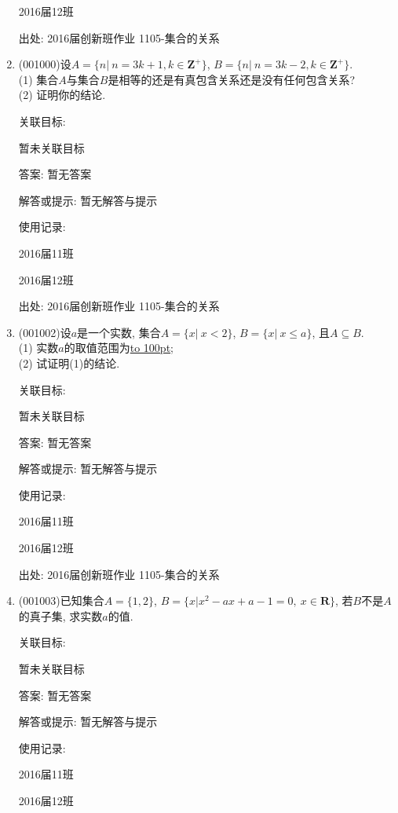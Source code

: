 \documentclass[10pt,a4paper]{article}
\newcommand{\blank}[1]{\underline{\hbox to #1pt{}}}
\begin{document}
\begin{enumerate}[1.]
2016届12班	


出处: 2016届创新班作业	1105-集合的关系
\item { (001000)}设$A=\{n|\ n=3k+1,k \in \mathbf{Z}^+\}$, $B=\{n|\ n=3k-2,k \in \mathbf{Z}^+\}$.\\ 
(1) 集合$A$与集合$B$是相等的还是有真包含关系还是没有任何包含关系?\\ 
(2) 证明你的结论.


关联目标:

暂未关联目标

答案: 暂无答案

解答或提示: 暂无解答与提示

使用记录:

2016届11班		

2016届12班		


出处: 2016届创新班作业	1105-集合的关系
\item { (001002)}设$a$是一个实数, 集合$A=\{x|\ x<2\}$, $B=\{x|\ x\leq a\}$, 且$A \subseteq B$.\\ 
(1) 实数$a$的取值范围为\blank{100};\\ 
(2) 试证明(1)的结论.


关联目标:

暂未关联目标

答案: 暂无答案

解答或提示: 暂无解答与提示

使用记录:

2016届11班		

2016届12班		


出处: 2016届创新班作业	1105-集合的关系
\item { (001003)}已知集合$A=\{1,2\}$, $B=\{x|x^2-ax+a-1=0,\ x\in\mathbf{R}\}$, 若$B$不是$A$的真子集, 求实数$a$的值.


关联目标:

暂未关联目标

答案: 暂无答案

解答或提示: 暂无解答与提示

使用记录:

2016届11班	

2016届12班	



\end{enumerate}
\end{document}

